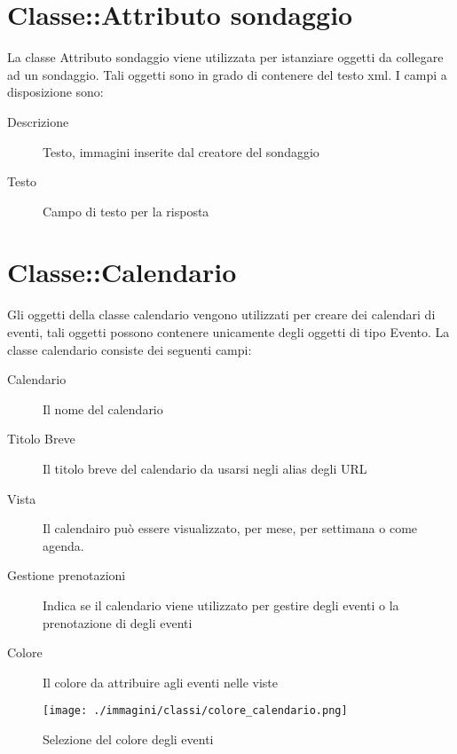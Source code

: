 \section{Classe::Attributo sondaggio}
La classe Attributo sondaggio viene utilizzata per istanziare oggetti da collegare ad un sondaggio. Tali oggetti sono in grado di contenere del testo xml. I campi a disposizione sono:
\begin{description}
 \item[Descrizione]Testo, immagini inserite dal creatore del sondaggio
\item[Testo] Campo di testo per la risposta
\end{description}

\section{Classe::Calendario}
Gli oggetti della classe calendario vengono utilizzati per creare dei calendari di eventi, tali oggetti possono contenere unicamente degli oggetti di tipo Evento. La classe calendario consiste dei seguenti campi:
\begin{description}
 \item[Calendario] Il nome del calendario
\item[Titolo Breve] Il titolo breve del calendario da usarsi negli alias degli URL
\item[Vista] Il calendairo può essere visualizzato, per mese, per settimana o come agenda.
\item[Gestione prenotazioni]Indica se il calendario viene utilizzato per gestire degli eventi o la prenotazione di degli eventi
\item[Colore] Il colore da attribuire agli eventi nelle viste
\end{description}
\begin{figure}[H]
 \centering
 \texttt{[image: ./immagini/classi/colore\_calendario.png]}
 \caption{Selezione del colore degli eventi}
 \label{fig:cal_col}
\end{figure}


